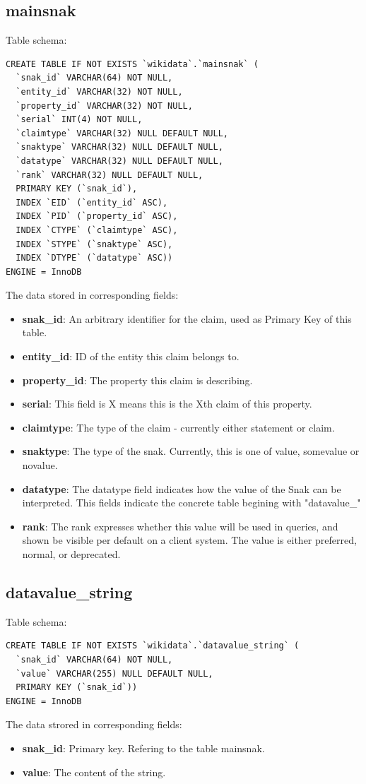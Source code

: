 \documentclass[12pt]{article}
\begin{document}
\subsection{mainsnak}
\lstset{language=SQL}
Table schema:
\begin{lstlisting}
CREATE TABLE IF NOT EXISTS `wikidata`.`mainsnak` (
  `snak_id` VARCHAR(64) NOT NULL,
  `entity_id` VARCHAR(32) NOT NULL,
  `property_id` VARCHAR(32) NOT NULL,
  `serial` INT(4) NOT NULL,
  `claimtype` VARCHAR(32) NULL DEFAULT NULL,
  `snaktype` VARCHAR(32) NULL DEFAULT NULL,
  `datatype` VARCHAR(32) NULL DEFAULT NULL,
  `rank` VARCHAR(32) NULL DEFAULT NULL,
  PRIMARY KEY (`snak_id`),
  INDEX `EID` (`entity_id` ASC),
  INDEX `PID` (`property_id` ASC),
  INDEX `CTYPE` (`claimtype` ASC),
  INDEX `STYPE` (`snaktype` ASC),
  INDEX `DTYPE` (`datatype` ASC))
ENGINE = InnoDB
\end{lstlisting}
The data stored in corresponding fields:
\begin{itemize}
\item \textbf{snak\_id}: An arbitrary identifier for the claim, used as Primary Key of this table.
\item \textbf{entity\_id}: ID of the entity this claim belongs to.
\item \textbf{property\_id}: The property this claim is describing.
\item \textbf{serial}: This field is X means this is the Xth claim of this property.
\item \textbf{claimtype}: The type of the claim - currently either statement or claim.
\item \textbf{snaktype}: The type of the snak. Currently, this is one of value, somevalue or novalue.
\item \textbf{datatype}: The datatype field indicates how the value of the Snak can be interpreted. This fields indicate the concrete table begining with "datavalue\_"
\item \textbf{rank}: The rank expresses whether this value will be used in queries, and shown be visible per default on a client system. The value is either preferred, normal, or deprecated.
\end{itemize}
\subsection{datavalue\_string}
\lstset{language=SQL}
Table schema:
\begin{lstlisting}
CREATE TABLE IF NOT EXISTS `wikidata`.`datavalue_string` (
  `snak_id` VARCHAR(64) NOT NULL,
  `value` VARCHAR(255) NULL DEFAULT NULL,
  PRIMARY KEY (`snak_id`))
ENGINE = InnoDB
\end{lstlisting}
The data strored in corresponding fields:
\begin{itemize}
\item \textbf{snak\_id}: Primary key. Refering to the table mainsnak.
\item \textbf{value}: The content of the string.
\end{itemize}
\end{document}
